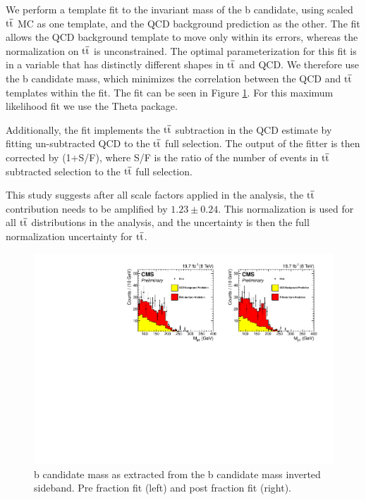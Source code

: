 We perform a template fit to the invariant mass of the b 
candidate, using scaled $\mathrm{t\overline{t}}$ MC as one template, and the QCD background prediction as the other.  The fit allows
the QCD background template to move only within its errors, whereas the normalization on $\mathrm{t\overline{t}}$ is unconstrained. 
The optimal parameterization for this fit is in a variable that has distinctly different shapes in $\mathrm{t\overline{t}}$ and QCD.  
We therefore use the b candidate mass, which minimizes the correlation between the QCD and $\mathrm{t\overline{t}}$ templates within the fit. The fit can be seen in Figure \ref{figs:ttbarfit}.  For this maximum likelihood fit we use the Theta package.

Additionally, the fit implements the $\mathrm{t\overline{t}}$ subtraction in the QCD estimate by fitting un-subtracted QCD to the $\mathrm{t\overline{t}}$ full selection.  The output of the fitter is then corrected by  
(1+S/F), where S/F is the ratio of the number of events in $\mathrm{t\overline{t}}$ subtracted selection to the $\mathrm{t\overline{t}}$ full selection. 

This study suggests after all scale factors applied in the analysis, the $\mathrm{t\overline{t}}$ contribution needs to be amplified by $1.23 \pm 0.24$.  
This normalization is used for all $\mathrm{t\overline{t}}$ distributions in the analysis, and the uncertainty is then the full normalization uncertainty for $\mathrm{t\overline{t}}$.

\begin{figure}[htcb]
\centering
\includegraphics[width=1.0\textwidth]{AN-13-004/figs/ttbarfittingfromthetatmass}
\caption{b candidate mass as extracted from the b candidate mass inverted sideband.  Pre fraction fit (left) and post fraction fit (right).}
\label{figs:ttbarfit}
\end{figure}




